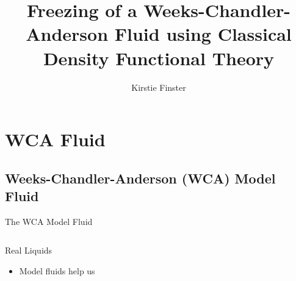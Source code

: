 \documentclass{beamer}
\title[Freezing a WCA Fluid using cDFT]{Freezing of a Weeks-Chandler-Anderson 
       Fluid using Classical Density Functional Theory}
\author{Kirstie Finster}
\begin{document}


\begin{frame}
	\titlepage
\end{frame}


\section*{WCA Fluid}

\subsection*{Weeks-Chandler-Anderson (WCA) Model Fluid}
\begin{frame}{The WCA Model Fluid}
	\begin{columns}[t]
       	\vspace{-1em}
		\begin{block}{Real Liquids}
			\begin{itemize}
			    \item Model fluids help us 
			    

\end{itemize}
\end{block}
\end{columns}
\end{frame}
\end{document}
